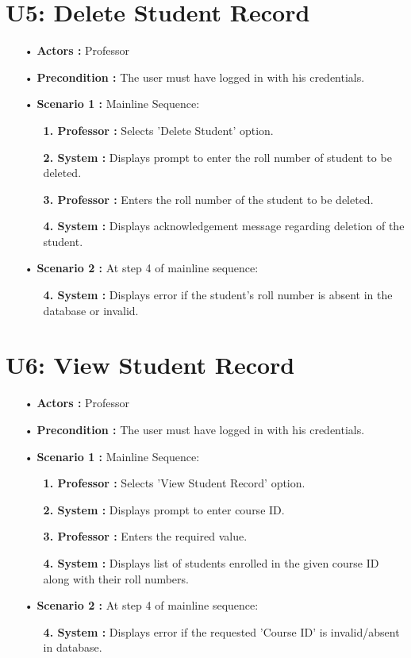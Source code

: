 \documentclass{scrreprt}
\begin{document}
\section{U5: Delete Student Record}
\begin{itemize}
\item [•] \textbf{Actors :} Professor
\item[•] \textbf{Precondition :} The user must have logged in with his credentials.
\item [•] \textbf{Scenario 1 :} Mainline Sequence:
\begin{itemize}
\item [] \textbf{1. Professor :} Selects 'Delete Student' option.
\item [] \textbf{2. System :} Displays prompt to enter the roll number of student to be deleted.
\item [] \textbf{3. Professor :} Enters the roll number of the student to be deleted.
\item [] \textbf{4. System :} Displays acknowledgement message regarding deletion of the student.
\end{itemize}
\item [•] \textbf{Scenario 2 :} At step 4 of mainline sequence:
\begin{itemize}
\item [] \textbf{4. System :} Displays error if the student's roll number is absent in the database or invalid.
\end{itemize}
\end{itemize}


\section{U6: View Student Record}
\begin{itemize}
\item [•] \textbf{Actors :} Professor
\item[•] \textbf{Precondition :} The user must have logged in with his credentials. 
\item [•] \textbf{Scenario 1 :} Mainline Sequence:
\begin{itemize}
\item [] \textbf{1. Professor :} Selects 'View Student Record' option.
\item [] \textbf{2. System :} Displays prompt to enter course ID.
\item [] \textbf{3. Professor :} Enters the required value.
\item [] \textbf{4. System :} Displays list of students enrolled in the given course ID along with their roll numbers. 
\end{itemize}
\item [•] \textbf{Scenario 2 :} At step 4 of mainline sequence:
\begin{itemize}
\item [] \textbf{4. System :} Displays error if the requested 'Course ID' is invalid/absent in database.
\end{itemize}
\end{itemize}
\end{document}
